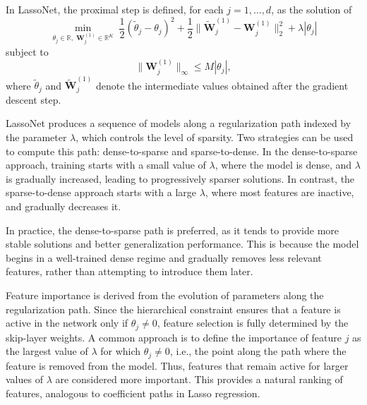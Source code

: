 In LassoNet, the proximal step is defined, for each $j = 1, \dots, d$, as the solution of
\begin{equation*}
\min_{\theta_j \in \mathbb{R}, \; \mathbf{W}^{(1)}_j \in \mathbb{R}^K}
\; \frac{1}{2} (\tilde{\theta}_j - \theta_j)^2
+ \frac{1}{2} \|\tilde{\mathbf{W}}^{(1)}_j - \mathbf{W}^{(1)}_j\|_2^2
+ \lambda |\theta_j|
\end{equation*}
subject to
\begin{equation*}
\|\mathbf{W}^{(1)}_j\|_{\infty} \leq M |\theta_j|,
\end{equation*}
where $\tilde{\theta}_j$ and $\tilde{\mathbf{W}}^{(1)}_j$ denote the intermediate values obtained after the gradient descent step. 

LassoNet produces a sequence of models along a regularization path indexed by the parameter $\lambda$, which controls the level of sparsity. Two strategies can be used to compute this path: dense-to-sparse and sparse-to-dense. In the dense-to-sparse approach, training starts with a small value of $\lambda$, where the model is dense, and $\lambda$ is gradually increased, leading to progressively sparser solutions. In contrast, the sparse-to-dense approach starts with a large $\lambda$, where most features are inactive, and gradually decreases it.

In practice, the dense-to-sparse path is preferred, as it tends to provide more stable solutions and better generalization performance. This is because the model begins in a well-trained dense regime and gradually removes less relevant features, rather than attempting to introduce them later.

Feature importance is derived from the evolution of parameters along the regularization path. Since the hierarchical constraint ensures that a feature is active in the network only if $\theta_j \neq 0$, feature selection is fully determined by the skip-layer weights. A common approach is to define the importance of feature $j$ as the largest value of $\lambda$ for which $\theta_j \neq 0$, i.e., the point along the path where the feature is removed from the model. Thus, features that remain active for larger values of $\lambda$ are considered more important. This provides a natural ranking of features, analogous to coefficient paths in Lasso regression.